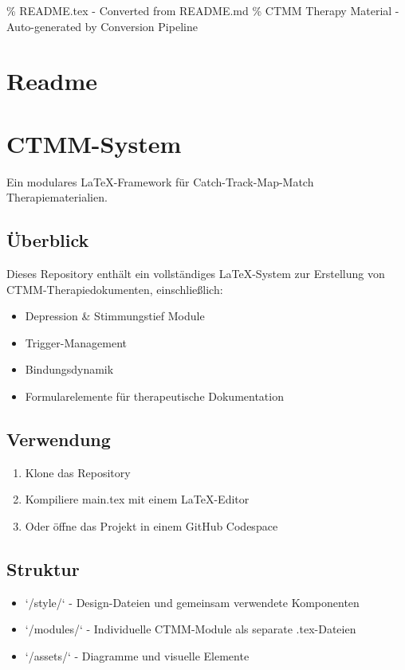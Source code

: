 \% README.tex - Converted from README.md
\% CTMM Therapy Material - Auto-generated by Conversion Pipeline

\section{Readme}
\label{sec:readme}

\section{\textcolor{ctmmBlue}{CTMM}-System}

Ein modulares LaTeX-Framework für Catch-Track-Map-Match Therapiematerialien.

\subsection{Überblick}
Dieses Repository enthält ein vollständiges LaTeX-System zur Erstellung von \textcolor{ctmmBlue}{CTMM}-Therapiedokumenten, einschließlich:
\begin{itemize}
\item Depression \& Stimmungstief Module
\item Trigger-Management
\item Bindungsdynamik
\item Formularelemente für therapeutische Dokumentation
\end{itemize}

\subsection{Verwendung}
\begin{enumerate}
\item Klone das Repository
\item Kompiliere main.tex mit einem LaTeX-Editor
\item Oder öffne das Projekt in einem GitHub Codespace
\end{enumerate}

\subsection{Struktur}
\begin{itemize}
\item `/style/` - Design-Dateien und gemeinsam verwendete Komponenten
\item `/modules/` - Individuelle CTMM-Module als separate .tex-Dateien
\item `/assets/` - Diagramme und visuelle Elemente
\end{itemize}

